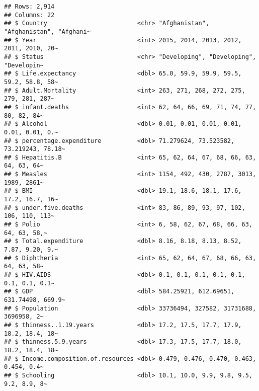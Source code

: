 \documentclass[
]{article}
\newenvironment{Shaded}{\begin{snugshade}}{\end{snugshade}}
\newcommand{\CommentTok}[1]{\textcolor[rgb]{0.56,0.35,0.01}{\textit{#1}}}
\newcommand{\FunctionTok}[1]{\textcolor[rgb]{0.13,0.29,0.53}{\textbf{#1}}}
\newcommand{\NormalTok}[1]{#1}
\newcommand{\OtherTok}[1]{\textcolor[rgb]{0.56,0.35,0.01}{#1}}
\newcommand{\SpecialCharTok}[1]{\textcolor[rgb]{0.81,0.36,0.00}{\textbf{#1}}}
\begin{document}
\begin{verbatim}
## Rows: 2,914
## Columns: 22
## $ Country                         <chr> "Afghanistan", "Afghanistan", "Afghani~
## $ Year                            <int> 2015, 2014, 2013, 2012, 2011, 2010, 20~
## $ Status                          <chr> "Developing", "Developing", "Developin~
## $ Life.expectancy                 <dbl> 65.0, 59.9, 59.9, 59.5, 59.2, 58.8, 58~
## $ Adult.Mortality                 <int> 263, 271, 268, 272, 275, 279, 281, 287~
## $ infant.deaths                   <int> 62, 64, 66, 69, 71, 74, 77, 80, 82, 84~
## $ Alcohol                         <dbl> 0.01, 0.01, 0.01, 0.01, 0.01, 0.01, 0.~
## $ percentage.expenditure          <dbl> 71.279624, 73.523582, 73.219243, 78.18~
## $ Hepatitis.B                     <int> 65, 62, 64, 67, 68, 66, 63, 64, 63, 64~
## $ Measles                         <int> 1154, 492, 430, 2787, 3013, 1989, 2861~
## $ BMI                             <dbl> 19.1, 18.6, 18.1, 17.6, 17.2, 16.7, 16~
## $ under.five.deaths               <int> 83, 86, 89, 93, 97, 102, 106, 110, 113~
## $ Polio                           <int> 6, 58, 62, 67, 68, 66, 63, 64, 63, 58,~
## $ Total.expenditure               <dbl> 8.16, 8.18, 8.13, 8.52, 7.87, 9.20, 9.~
## $ Diphtheria                      <int> 65, 62, 64, 67, 68, 66, 63, 64, 63, 58~
## $ HIV.AIDS                        <dbl> 0.1, 0.1, 0.1, 0.1, 0.1, 0.1, 0.1, 0.1~
## $ GDP                             <dbl> 584.25921, 612.69651, 631.74498, 669.9~
## $ Population                      <dbl> 33736494, 327582, 31731688, 3696958, 2~
## $ thinness..1.19.years            <dbl> 17.2, 17.5, 17.7, 17.9, 18.2, 18.4, 18~
## $ thinness.5.9.years              <dbl> 17.3, 17.5, 17.7, 18.0, 18.2, 18.4, 18~
## $ Income.composition.of.resources <dbl> 0.479, 0.476, 0.470, 0.463, 0.454, 0.4~
## $ Schooling                       <dbl> 10.1, 10.0, 9.9, 9.8, 9.5, 9.2, 8.9, 8~
\end{verbatim}

\begin{Shaded}
\end{Shaded}
\end{document}
